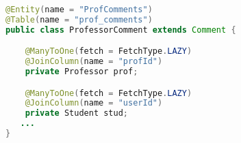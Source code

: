 \begin{lstlisting}[language=Java,  basicstyle=\footnotesize]
@Entity(name = "ProfComments")
@Table(name = "prof_comments")
public class ProfessorComment extends Comment {

	@ManyToOne(fetch = FetchType.LAZY)
	@JoinColumn(name = "profId")
	private Professor prof;

	@ManyToOne(fetch = FetchType.LAZY)
	@JoinColumn(name = "userId")
	private Student stud;
   ...
}
\end{lstlisting}